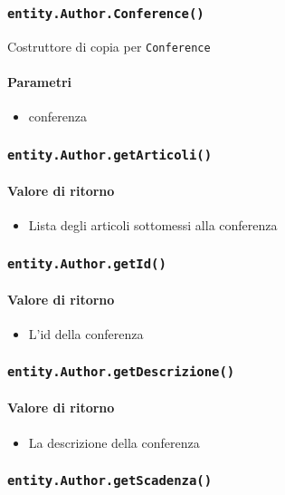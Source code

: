 \subsubsection{\texttt{entity.Author.Conference()}}
Costruttore di copia per \texttt{Conference}
\paragraph{Parametri}
\begin{itemize}
\item conferenza
\end{itemize}

\subsubsection{\texttt{entity.Author.getArticoli()}}
\paragraph{Valore di ritorno}
\begin{itemize}
\item Lista degli articoli sottomessi alla conferenza
\end{itemize}
\subsubsection{\texttt{entity.Author.getId()}}
\paragraph{Valore di ritorno}
\begin{itemize}
\item L'id della conferenza
\end{itemize}
\subsubsection{\texttt{entity.Author.getDescrizione()}}
\paragraph{Valore di ritorno}
\begin{itemize}
\item La descrizione della conferenza
\end{itemize}
\subsubsection{\texttt{entity.Author.getScadenza()}}

